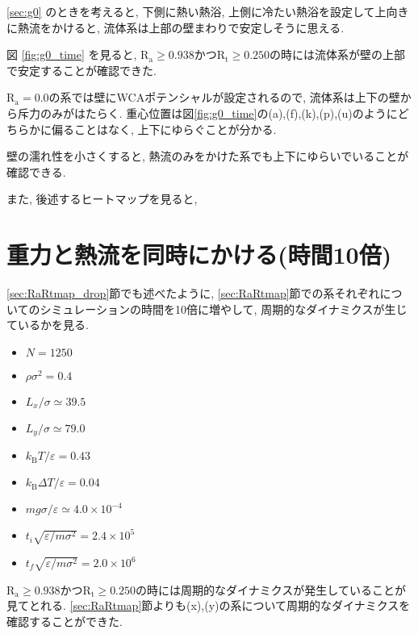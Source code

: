 

\ref{sec:g0} のときを考えると, 下側に熱い熱浴, 上側に冷たい熱浴を設定して上向きに熱流をかけると, 流体系は上部の壁まわりで安定しそうに思える.

図 \ref{fig:g0_time} を見ると, $\text{R}_\text{a} \ge 0.938 かつ \text{R}_\text{t} \ge 0.250$の時には流体系が壁の上部で安定することが確認できた.

$\text{R}_\text{a}=0.0$の系では壁にWCAポテンシャルが設定されるので, 流体系は上下の壁から斥力のみがはたらく. 重心位置は図\ref{fig:g0_time}の(a),(f),(k),(p),(u)のようにどちらかに偏ることはなく, 上下にゆらぐことが分かる.

壁の濡れ性を小さくすると, 熱流のみをかけた系でも上下にゆらいでいることが確認できる. 

また, 後述するヒートマップを見ると, 

\section{重力と熱流を同時にかける(時間10倍)}\label{sec:RaRtmap10}

\ref{sec:RaRtmap_drop}節でも述べたように, \ref{sec:RaRtmap}節での系それぞれについてのシミュレーションの時間を10倍に増やして, 周期的なダイナミクスが生じているかを見る. 

\begin{itemize}
  \item $N = 1250$
  \item $\rho {\sigma}^2 = 0.4$
  \item $L_x / \sigma \simeq 39.5$
  \item $L_y / \sigma \simeq 79.0$
  \item $k_{\text{B}} T / \varepsilon = 0.43$
  \item $k_{\text{B}} \Delta T / \varepsilon = 0.04$
  \item $mg\sigma/\varepsilon \simeq 4.0 \times 10^{-4}$
  \item $t_i \sqrt{\varepsilon / m \sigma^2}= 2.4 \times 10^5$
  \item $t_f \sqrt{\varepsilon / m \sigma^2} = 2.0 \times 10^{6}$
\end{itemize}



$\text{R}_\text{a} \ge 0.938 かつ\text{R}_\text{t} \ge 0.250$の時には周期的なダイナミクスが発生していることが見てとれる. \ref{sec:RaRtmap}節よりも(x),(y)の系について周期的なダイナミクスを確認することができた. 

